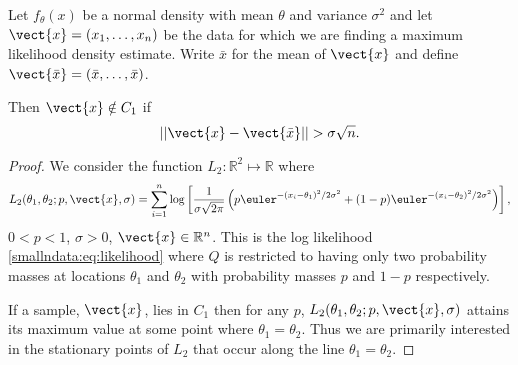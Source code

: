 	\begin{theorem} \label{thm:shapeofC1normala}
		Let $f_\theta(x)$ be a normal density with mean $\theta$ and variance $\sigma^2$ and let $\vect{x} = (x_1,\dots,x_n)$ be the data for which we are finding a maximum likelihood density estimate. Write $\bar{x}$ for the mean of $\vect{x}$ and define $\vect{\bar{x}} = (\bar{x},\dots,\bar{x})$.
		
		Then $\vect{x} \notin C_1$ if
		$$|| \vect{x} - \vect{\bar{x}}|| > \sigma \sqrt{n}.$$
	\end{theorem}
	\begin{proof}
		We consider the function $L_2: \mathbb{R}^2 \mapsto \mathbb{R}$ where
		\begin{equation}\label{smallndata:eq:L2}
			L_2(\theta_1,\theta_2;p,\vect{x},\sigma) = \sum_{i = 1}^n \log\left[ \frac{1}{\sigma \sqrt{2 \pi}} \left( p \euler^{-(x_i - \theta_1)^2/2\sigma^2} + (1-p) \euler^{-(x_i - \theta_2)^2/2\sigma^2}\right) \right],
		\end{equation}
		$0<p<1$, $\sigma> 0$, $\vect{x} \in \mathbb{R}^n$.
		This is the log likelihood \eqref{smallndata:eq:likelihood} where $Q$ is restricted to having only two probability masses at locations $\theta_1$ and $\theta_2$ with probability masses $p$ and $1 - p$ respectively. 
		
		If a sample, $\vect{x}$, lies in $C_1$ then for any $p$, $L_2(\theta_1,\theta_2;p,\vect{x},\sigma)$ attains its maximum value at some point where $\theta_1 = \theta_2$. Thus we are primarily interested in the stationary points of $L_2$ that occur along the line $\theta_1 = \theta_2$.
		

\end{proof}
